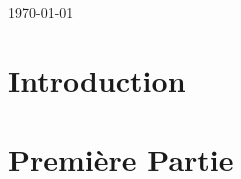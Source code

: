 \documentclass{article}
\begin{document}
\begin{titlepage}
\begin{minipage}{0.4\textwidth}
\begin{flushleft}
\end{flushleft}


\end{minipage}\\[2cm]

{\large \today}\\[2cm] %

\vfill %

\end{titlepage}

\newpage

\tableofcontents

\newpage
{}

\section{Introduction}


\section{Première Partie}


\newpage
\nocite{*}
\printbibliography



\begin{appendix}
\end{appendix}
\end{document}
